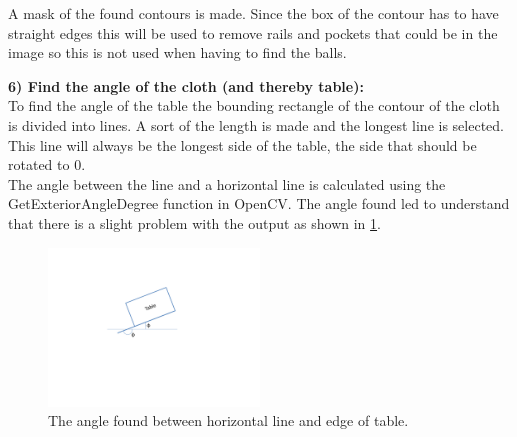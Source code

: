 A mask of the found contours is made. Since the box of the contour has to have straight edges this will be used to remove rails and pockets that could be in the image so this is not used when having to find the balls.

\begin{figure}[H]
\centering
{}
\end{figure}

\textbf{6) Find the angle of the cloth (and thereby table):}\\
To find the angle of the table the bounding rectangle of the contour of the cloth is divided into lines. A sort of the length is made and the longest line is selected. This line will always be the longest side of the table, the side that should be rotated to 0\degree. \\

The angle between the line and a horizontal line is calculated using the GetExteriorAngleDegree function in OpenCV\cite{opencv}. The angle found led to understand that there is a slight problem with the output as shown in \ref{fig:table_angle}.

\begin{figure}[H]
\begin{center}
\leavevmode
\includegraphics[width=0.5\textwidth]{images/table_angle}
\end{center}
\caption{The angle found between horizontal line and edge of table.}
\label{fig:table_angle}
\end{figure}

